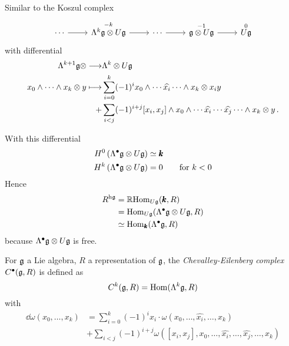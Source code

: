 Similar to the Koszul complex
\begin{equation*}
    \begin{tikzcd}
    \cdots \arrow[r] &
    \overset{-k}{\Lambda^k\gfrak\otimes U\gfrak} \arrow[r] &
    \cdots \arrow[r] &
    \overset{-1}{\gfrak\otimes U\gfrak} \arrow[r] &
    \overset{0}{U\gfrak}
  \end{tikzcd}
\end{equation*}
with differential
\begin{align*}
  \Lambda^{k+1}\mathfrak{g}\otimes\longrightarrow&\Lambda^k\otimes{}U\mathfrak{g}\\
  x_0\wedge\cdots\wedge{}x_k\otimes y \longmapsto& \sum_{i=0}^k (-1)^i x_0\wedge\cdots\widehat{x_i}\cdots\wedge x_k \otimes x_i y\\
  +&\sum_{i<j} (-1)^{i+j} [x_i,x_j]\wedge x_0\wedge\cdots\widehat{x_i}\cdots\widehat{x_j}\cdots\wedge x_k \otimes y\,.
\end{align*}

With this differential
\begin{align*}
  H^0 \left(\Lambda^\bullet\gfrak\otimes U\gfrak\right)&\simeq \kbold\\ %
  H^k \left(\Lambda^\bullet\gfrak\otimes U\gfrak\right)&=0 \qquad \text{for $k<0$}
\end{align*}
Hence
\begin{align*}
  R^{\mathrm{h}\mathfrak{g}}&=\mathbb{R}\mathrm{Hom}_{U\mathfrak{g}} (\pmb{k}, R)\\
                      &=\mathrm{Hom}_{U\mathfrak{g}} (\Lambda^{\bullet}\mathfrak{g}\otimes U\mathfrak{g}, R)\\
                      &\simeq\mathrm{Hom}_{\pmb{k}} (\Lambda^{\bullet}\mathfrak{g}, R)
\end{align*}
because $\Lambda^\bullet\mathfrak{g}\otimes{}U\mathfrak{g}$ is free.

\begin{definition}
  For $\mathfrak{g}$ a Lie algebra, $R$ a representation of $\mathfrak{g}$, the
  {\em Chevalley-Eilenberg complex} $C^\bullet (\mathfrak{g},R)$ is defined as
  \begin{equation*}
    C^k (\mathfrak{g},R)=\mathrm{Hom} (\Lambda^k\mathfrak{g},R)
  \end{equation*}
  with
  \begin{align*}
    \dd\omega (x_0,\ldots,x_k)&=\sum_{i=0}^{k} (-1)^i x_i\cdot\omega (x_0,\ldots,\widehat{x_i},\ldots,x_k)\\
                              &+\sum_{i<j} (-1)^{i+j} \omega ([x_i,x_j],x_0,\ldots,\widehat{x_i},\ldots,\widehat{x_j},\ldots,x_k)
  \end{align*}
\end{definition}

